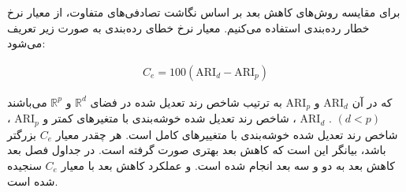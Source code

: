 برای مقایسه روش‌های کاهش بعد بر اساس نگاشت تصادفی‌های متفاوت، از معیار نرخ خطار رده‌بندی استفاده می‌کنیم. معیار نرخ خطای رده‌بندی به صورت زیر تعریف می‌شود:

\begin{align}
C_e = 100 ( \mathrm{ARI}_d - \mathrm{ARI}_p )
\label{eq:1jT}
\end{align}

که در آن 
$\mathrm{ARI}_d$
و 
‌$\mathrm{ARI}_p$
به ترتیب شاخص رند تعدیل شده در فضای 
$\mathbb{R}^d$
و 
$\mathbb{R}^p$
می‌باشند
$(d < p)$
. 
$\mathrm{ARI}_d$
، شاخص رند تعدیل شده خوشه‌بندی با متغیرهای کمتر و 
$\mathrm{ARI}_p$
، شاخص رند تعدیل شده خوشه‌بندی با متغییرهای کامل است. هر چقدر معیار
$C_e$
بزرگتر باشد، بیانگر این است که کاهش بعد بهتری صورت گرفته است.
در جداول فصل بعد کاهش بعد به دو و سه بعد انجام شده است. و عملکرد کاهش بعد با معیار $C_e$ سنجیده شده است.



